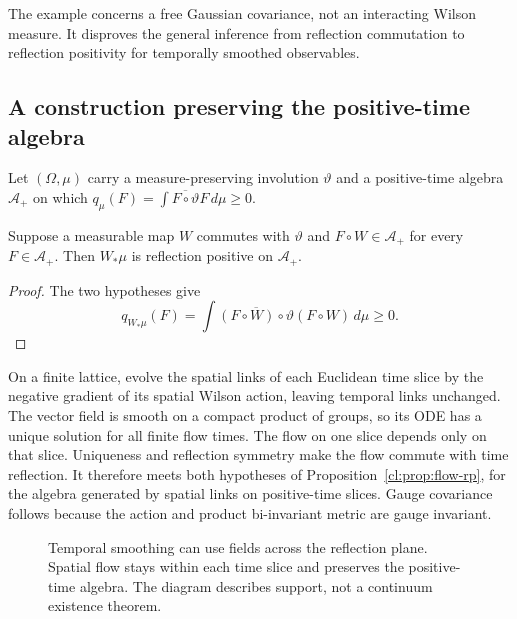 The example concerns a free Gaussian covariance, not an interacting
Wilson measure. It disproves the general inference from reflection
commutation to reflection positivity for temporally smoothed observables.

\subsection{A construction preserving the positive-time algebra}
Let $(\Omega,\mu)$ carry a measure-preserving involution $\vartheta$ and
a positive-time algebra $\mathcal A_+$ on which
$q_\mu(F)=\int\overline{F\circ\vartheta}F\,d\mu\ge0$.

\begin{proposition}\label{cl:prop:flow-rp}
Suppose a measurable map $W$ commutes with $\vartheta$ and
$F\circ W\in\mathcal A_+$ for every $F\in\mathcal A_+$.
Then $W_*\mu$ is reflection positive on $\mathcal A_+$.
\end{proposition}
\begin{proof}
The two hypotheses give
\[
q_{W_*\mu}(F)
=\int\overline{(F\circ W)\circ\vartheta}(F\circ W)\,d\mu\ge0.
\]
\end{proof}

On a finite lattice, evolve the spatial links of each Euclidean time
slice by the negative gradient of its spatial Wilson action, leaving
temporal links unchanged. The vector field is smooth on a compact
product of groups, so its ODE has a unique solution for all finite flow
times. The flow on one slice depends only on that slice. Uniqueness
and reflection symmetry make the flow commute with time reflection.
It therefore meets both hypotheses of
Proposition~\ref{cl:prop:flow-rp}, for the algebra generated by spatial
links on positive-time slices. Gauge covariance follows because the
action and product bi-invariant metric are gauge invariant.

\begin{figure}[htbp]
\centering
{}
\caption{Temporal smoothing can use fields across the reflection plane.
Spatial flow stays within each time slice and preserves the positive-time
algebra. The diagram describes support, not a continuum existence theorem.}
\label{cl:fig:flow-support}
\end{figure}

